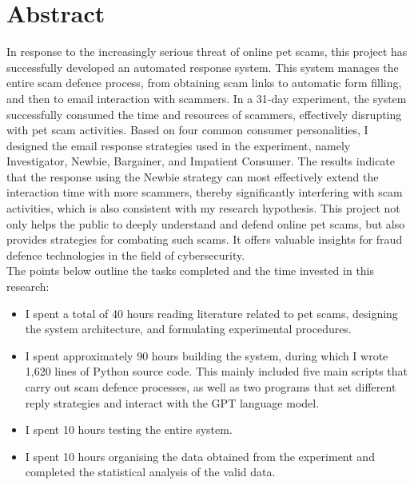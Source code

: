 \documentclass[ oneside,%
                    author={Cassie Qing Tang},
                    degree={BSc},
                     title={An Automated Response System for Disrupting Online Pet Scamming \\ },
                    subtitle={ }]{dissertation}
\begin{document}
\maketitle

\chapter*{Abstract}
In response to the increasingly serious threat of online pet scams, this project has successfully developed an automated response system. This system manages the entire scam defence process, from obtaining scam links to automatic form filling, and then to email interaction with scammers. In a 31-day experiment, the system successfully consumed the time and resources of scammers, effectively disrupting with pet scam activities. Based on four common consumer personalities, I designed the email response strategies used in the experiment, namely Investigator, Newbie, Bargainer, and Impatient Consumer. The results indicate that the response using the Newbie strategy can most effectively extend the interaction time with more scammers, thereby significantly interfering with scam activities, which is also consistent with my research hypothesis. This project not only helps the public to deeply understand and defend online pet scams, but also provides strategies for combating such scams. It offers valuable insights for fraud defence technologies in the field of cybersecurity.
\\

The points below outline the tasks completed and the time invested in this research:

\begin{itemize}
  \item I spent a total of 40 hours reading literature related to pet scams, designing the system architecture, and formulating experimental procedures.
  \item I spent approximately 90 hours building the system, during which I wrote 1,620 lines of Python source code. This mainly included five main scripts that carry out scam defence processes, as well as two programs that set different reply strategies and interact with the GPT language model.
  \item I spent 10 hours testing the entire system.
  \item I spent 10 hours organising the data obtained from the experiment and completed the statistical analysis of the valid data.
\end{itemize}
\end{document}
